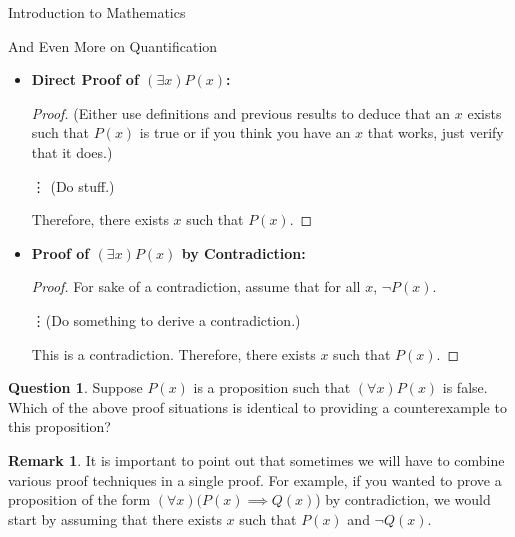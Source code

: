 \documentclass[11pt]{article}
\theoremstyle{definition}
\newtheorem{remark}[theorem]{Remark}
\newtheorem{question}[theorem]{Question}
\begin{document}
\begin{section}{Introduction to Mathematics}
\begin{subsection}{And Even More on Quantification}
\begin{itemize}
\begin{proof}
\bigskip

\noindent This is a contradiction.  Therefore, for all $x$, $P(x)$ is true.
\end{proof}

\item[] \textbf{Direct Proof of $(\exists x)P(x)$:}

\begin{proof}
(Either use definitions and previous results to deduce that an $x$ exists such that $P(x)$ is true or if you think you have an $x$ that works, just verify that it does.)

\bigskip

\hspace{2in}\vdots \hspace{1cm} (Do stuff.)

\bigskip

Therefore, there exists $x$ such that $P(x)$.
\end{proof}

\item[] \textbf{Proof of $(\exists x)P(x)$ by Contradiction:}

\begin{proof}
For sake of a contradiction, assume that for all $x$, $\neg P(x)$.

\bigskip

\hspace{2in}\vdots \hspace{1cm}(Do something to derive a contradiction.)

\bigskip

This is a contradiction.  Therefore, there exists $x$ such that $P(x)$.
\end{proof}

\end{itemize}

\begin{question}
Suppose $P(x)$ is a proposition such that $(\forall x)P(x)$ is false.  Which of the above proof situations is identical to providing a counterexample to this proposition?
\end{question}

\begin{remark}
It is important to point out that sometimes we will have to combine various proof techniques in a single proof.  For example, if you wanted to prove a proposition of the form $(\forall x)(P(x) \implies Q(x)$) by contradiction, we would start by assuming that there exists $x$ such that $P(x)$ and $\neg Q(x)$.
\end{remark}


\end{subsection}
\end{section}
\end{document}
